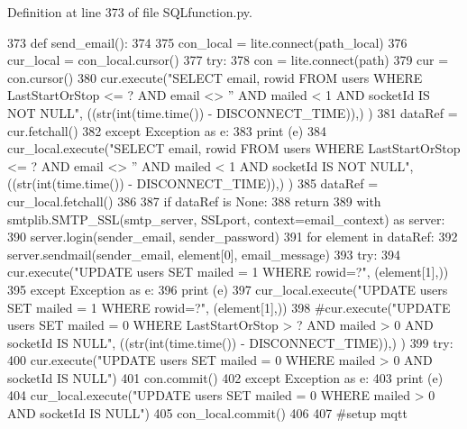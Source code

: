 Definition at line 373 of file S\+Q\+Lfunction.\+py.


\begin{DoxyCode}
373 \textcolor{keyword}{def }send_email():
374     
375     con\_local = lite.connect(path\_local)
376     cur\_local = con\_local.cursor()
377     \textcolor{keywordflow}{try}:
378         con = lite.connect(path)
379         cur = con.cursor()
380         cur.execute(\textcolor{stringliteral}{"SELECT email, rowid FROM users WHERE LastStartOrStop <= ? AND email <> '' AND mailed <
       1 AND socketId IS NOT NULL"}, ((str(int(time.time()) - DISCONNECT\_TIME)),) )
381         dataRef = cur.fetchall()
382     \textcolor{keywordflow}{except} Exception \textcolor{keyword}{as} e:
383         \textcolor{keywordflow}{print} (e)        
384         cur\_local.execute(\textcolor{stringliteral}{"SELECT email, rowid FROM users WHERE LastStartOrStop <= ? AND email <> '' AND
       mailed < 1 AND socketId IS NOT NULL"}, ((str(int(time.time()) - DISCONNECT\_TIME)),) )
385         dataRef = cur\_local.fetchall()
386         
387     \textcolor{keywordflow}{if} dataRef \textcolor{keywordflow}{is} \textcolor{keywordtype}{None}:
388         \textcolor{keywordflow}{return}
389     with smtplib.SMTP\_SSL(smtp\_server, SSLport, context=email\_context) \textcolor{keyword}{as} server:
390         server.login(sender\_email, sender\_password)
391         \textcolor{keywordflow}{for} element \textcolor{keywordflow}{in} dataRef:            
392             server.sendmail(sender\_email, element[0], email\_message)
393             \textcolor{keywordflow}{try}:
394                 cur.execute(\textcolor{stringliteral}{"UPDATE users SET mailed = 1 WHERE rowid=?"}, (element[1],))
395             \textcolor{keywordflow}{except} Exception \textcolor{keyword}{as} e:
396                 \textcolor{keywordflow}{print} (e)
397             cur\_local.execute(\textcolor{stringliteral}{"UPDATE users SET mailed = 1 WHERE rowid=?"}, (element[1],))
398     \textcolor{comment}{#cur.execute("UPDATE users SET mailed = 0 WHERE LastStartOrStop > ? AND mailed > 0 AND socketId IS
       NULL", ((str(int(time.time()) - DISCONNECT\_TIME)),) ) }
399     \textcolor{keywordflow}{try}:
400         cur.execute(\textcolor{stringliteral}{"UPDATE users SET mailed = 0 WHERE mailed > 0 AND socketId IS NULL"}) 
401         con.commit()
402     \textcolor{keywordflow}{except} Exception \textcolor{keyword}{as} e:
403         \textcolor{keywordflow}{print} (e)
404     cur\_local.execute(\textcolor{stringliteral}{"UPDATE users SET mailed = 0 WHERE mailed > 0 AND socketId IS NULL"}) 
405     con\_local.commit()
406 
407 \textcolor{comment}{#setup mqtt}
\end{DoxyCode}
\mbox{\label{namespace_s_q_lfunction_ae16644514ae2cdbf375884361531f691}} 
